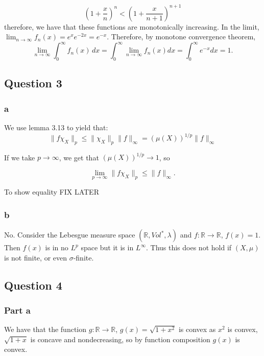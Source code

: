 \documentclass{article}
\theoremstyle{definition}
\numberwithin{theorem}{section}
\numberwithin{equation}{section}
\begin{document}
\begin{equation}
	\left( 1 + \frac{x}{n}\right)^n < \left( 1 + \frac{x}{n+1}\right)^{n + 1}
\end{equation}
therefore, we have that these functions are monotonically increasing. In the limit,
$\lim_{n \rightarrow \infty} f_n(x) = e^{x} e^{-2x} = e^{-x}$. 
Therefore, by monotone convergence theorem,
\begin{equation}
	\lim_{n \rightarrow \infty} \int_{0}^\infty f_n(x) \, dx = \int_{0}^\infty \lim_{n \rightarrow \infty} f_n(x) dx = \int_{0}^\infty e^{-x} dx = 1. 
\end{equation}
\subsection*{Question 3}
\subsubsection*{a}
We use lemma 3.13 to yield that:
\begin{equation}
	\| f \chi_X \|_p \leq \| \chi_X \|_p \|f \|_\infty = (\mu(X))^{1/p} \|f \|_{\infty}
\end{equation}

If we take $p \rightarrow \infty$, we get that $(\mu(X))^{1/p} \rightarrow 1$, so 

\begin{equation}
	\lim_{p \rightarrow \infty} \| f \chi_X \|_p \leq \|f \|_{\infty}.
\end{equation}

To show equality FIX LATER

\subsubsection*{b}
No. Consider the Lebesgue measure space $(\mathbb{R}, Vol^*, \lambda)$ and $f : \mathbb{R} \rightarrow \mathbb{R}$, $f(x) = 1$. Then $f(x)$ is in no $L^p$ space but it is in $L^\infty$. Thus this does not hold if $(X, \mu)$ is not finite, or even $\sigma$-finite. 
\subsection*{Question 4}
\subsubsection*{Part a}
We have that the function $g: \mathbb{R} \rightarrow \mathbb{R}$, $g(x) = \sqrt{1 + x^2}$ is convex as $x^2$ is convex, $\sqrt{1 + x}$ is concave and nondecreasing, so by function composition $g(x)$ is convex. 
\end{document}
